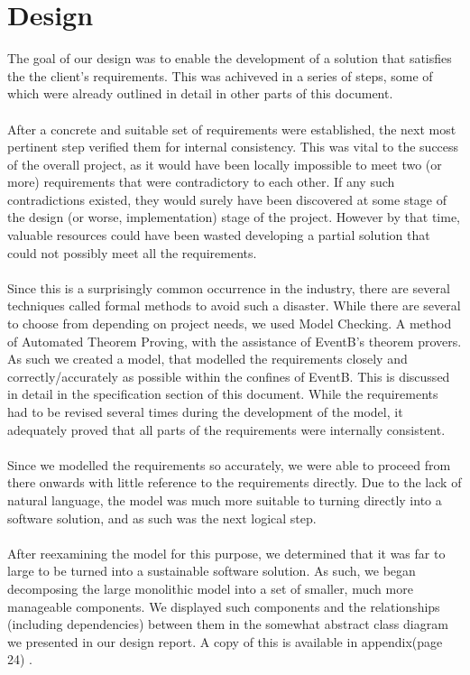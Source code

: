 \documentclass[a4paper]{article}
\begin{document}
\section{Design}
The goal of our design was to enable the development of a solution that satisfies the the client’s requirements. This was achiveved in a series of steps, some of which were already outlined in detail in other parts of this document.
\\\\
After a concrete and suitable set of requirements were established, the next most pertinent step verified them for internal consistency. This was vital to the success of the overall project, as it would have been locally impossible to meet two (or more) requirements that were contradictory to each other. If any such contradictions existed, they would surely have been discovered at some stage of the design (or worse, implementation) stage of the project. However by that time, valuable resources could have been wasted developing a partial solution that could not possibly meet all the requirements.
\\\\
Since this is a surprisingly common occurrence in the industry, there are several techniques called formal methods to avoid such a disaster. While there are several to choose from depending on project needs, we used Model Checking. A method of Automated Theorem Proving, with the assistance of EventB’s theorem provers. As such we created a model, that modelled the requirements closely and correctly/accurately as possible within the confines of EventB. This is discussed in detail in the specification section  of this document. While the requirements had to be revised several times during the development of the model, it adequately proved that all parts of the requirements were internally consistent.
\\\\
Since we modelled the requirements so accurately, we were able to proceed from there onwards with little reference to the requirements directly. Due to the lack of natural language, the model was much more suitable to turning directly into a software solution, and as such was the next logical step. 
\\\\
After reexamining the model for this purpose, we determined that it was far to large to be turned into a sustainable software solution. As such, we began decomposing the large monolithic model into a set of smaller, much more manageable components. We displayed such components and the relationships (including dependencies) between them in the somewhat abstract class diagram we presented in our design report. A copy of this is available in appendix(page 24) . 
\end{document}
